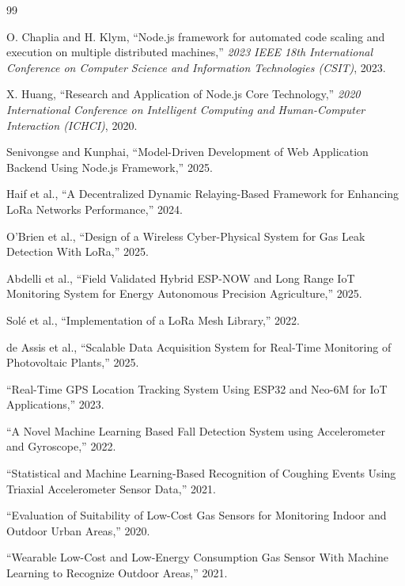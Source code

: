 \documentclass[12pt,a4paper]{article}
\begin{document}
	\begin{thebibliography}{99}
		
		O. Chaplia and H. Klym, ``Node.js framework for automated code scaling and execution on multiple distributed machines,'' \textit{2023 IEEE 18th International Conference on Computer Science and Information Technologies (CSIT)}, 2023.
		
		X. Huang, ``Research and Application of Node.js Core Technology,'' \textit{2020 International Conference on Intelligent Computing and Human-Computer Interaction (ICHCI)}, 2020.
		
		Senivongse and Kunphai, ``Model-Driven Development of Web Application Backend Using Node.js Framework,'' 2025.
		
		Haif et al., ``A Decentralized Dynamic Relaying-Based Framework for Enhancing LoRa Networks Performance,'' 2024.
		
		O'Brien et al., ``Design of a Wireless Cyber-Physical System for Gas Leak Detection With LoRa,'' 2025.
		
		Abdelli et al., ``Field Validated Hybrid ESP-NOW and Long Range IoT Monitoring System for Energy Autonomous Precision Agriculture,'' 2025.
		
		Sol{\'e} et al., ``Implementation of a LoRa Mesh Library,'' 2022.
		
		de Assis et al., ``Scalable Data Acquisition System for Real-Time Monitoring of Photovoltaic Plants,'' 2025.
		
		``Real-Time GPS Location Tracking System Using ESP32 and Neo-6M for IoT Applications,'' 2023.
		
		``A Novel Machine Learning Based Fall Detection System using Accelerometer and Gyroscope,'' 2022.
		
		``Statistical and Machine Learning-Based Recognition of Coughing Events Using Triaxial Accelerometer Sensor Data,'' 2021.
		
		``Evaluation of Suitability of Low-Cost Gas Sensors for Monitoring Indoor and Outdoor Urban Areas,'' 2020.
		
		``Wearable Low-Cost and Low-Energy Consumption Gas Sensor With Machine Learning to Recognize Outdoor Areas,'' 2021.
		

\end{thebibliography}
\end{document}
